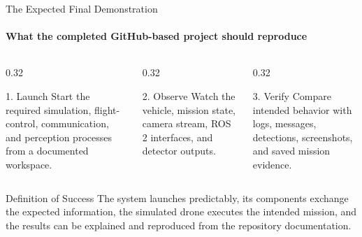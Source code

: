 \begin{frame}{The Expected Final Demonstration}
\framesubtitle{What the completed GitHub-based project should reproduce}
\footnotesize
\begin{columns}[T,onlytextwidth]
    \begin{column}{0.32\textwidth}
        \begin{block}{1. Launch}
            Start the required simulation, flight-control, communication, and perception processes from a documented workspace.
        \end{block}
    \end{column}
    \pause
    \begin{column}{0.32\textwidth}
        \begin{block}{2. Observe}
            Watch the vehicle, mission state, camera stream, ROS 2 interfaces, and detector outputs.
        \end{block}
    \end{column}
    \pause
    \begin{column}{0.32\textwidth}
        \begin{block}{3. Verify}
            Compare intended behavior with logs, messages, detections, screenshots, and saved mission evidence.
        \end{block}
    \end{column}
\end{columns}
\begin{exampleblock}{Definition of Success}
The system launches predictably, its components exchange the expected information, the simulated drone executes the intended mission, and the results can be explained and reproduced from the repository documentation.
\end{exampleblock}
\end{frame}

